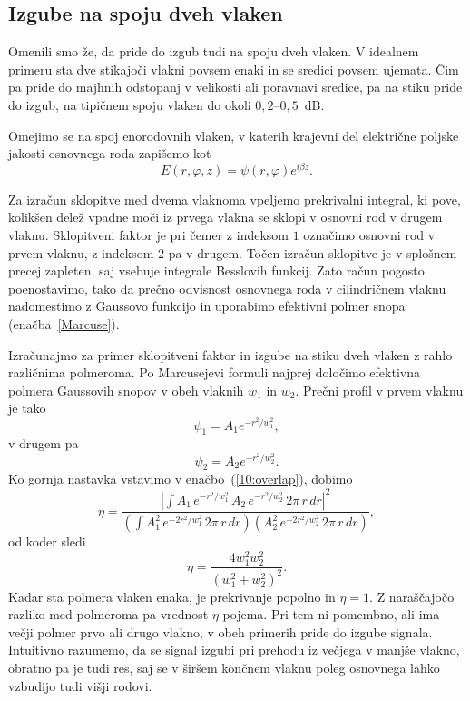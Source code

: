 \subsection*{Izgube na spoju dveh vlaken}
Omenili smo že, da pride do izgub tudi na spoju dveh vlaken. 
V idealnem primeru sta dve stikajoči vlakni povsem enaki in se sredici povsem ujemata. 
Čim pa pride do majhnih odstopanj v velikosti ali poravnavi sredice, pa na stiku pride 
do izgub, na tipičnem spoju vlaken do okoli $0,2$--$0,5$~dB.

Omejimo se na spoj enorodovnih vlaken, v katerih krajevni del 
električne poljske jakosti osnovnega roda zapišemo kot
\begin{equation}
E(r, \varphi, z)=\psi(r, \varphi) e^{i\beta z}.
\end{equation} 

Za izračun sklopitve med dvema vlaknoma vpeljemo prekrivalni integral,
ki pove, kolikšen delež vpadne moči iz prvega vlakna 
se sklopi v osnovni rod v drugem vlaknu. Sklopitveni faktor je
pri čemer z indeksom $1$ označimo osnovni rod v prvem vlaknu, z indeksom $2$ pa 
v drugem. Točen izračun sklopitve je v splošnem precej zapleten, saj vsebuje integrale
Besslovih funkcij. Zato račun pogosto poenostavimo, tako 
da prečno odvisnost osnovnega roda v cilindričnem vlaknu nadomestimo z 
Gaussovo funkcijo in uporabimo efektivni polmer snopa (enačba~\ref{Marcuse}). 

Izračunajmo za primer sklopitveni faktor in izgube na stiku dveh vlaken z rahlo 
različnima polmeroma. Po Marcusejevi formuli najprej določimo efektivna polmera Gaussovih snopov
v obeh vlaknih $w_1$ in $w_2$. Prečni profil v prvem vlaknu je tako
\begin{equation}
\psi_1 = A_1 e^{-r^2/w_1^2},
\end{equation}
v drugem pa 
\begin{equation}
\psi_2 = A_2 e^{-r^2/w_2^2}.
\end{equation}
Ko gornja nastavka vstavimo v enačbo~(\ref{10:overlap}), dobimo
\begin{equation}
\eta = \frac{|\int A_1 \, e^{-r^2/w_1^2}\, A_2\, e^{-r^2/w_2^2}\, 2 \pi\, r\, dr|^2}
{\left(\int A_1^2 \,e^{-2r^2/w_1^2} \, 2 \pi \, r\, dr \right) \left( A_2^2\, 
e^{-2r^2/w_2^2}\, 2 \pi \, r\, dr \right)},
\end{equation}
od koder sledi
\begin{equation}
\eta = \frac{4 w_1^2 w_2^2}{(w_1^2+w_2^2)^2}.
\end{equation}
Kadar sta polmera vlaken enaka, je prekrivanje popolno in $\eta = 1$. Z naraščajočo razliko
med polmeroma pa vrednost $\eta$ pojema. Pri tem
ni pomembno, ali ima večji polmer prvo ali drugo vlakno, v obeh primerih pride do izgube 
signala. Intuitivno razumemo, da se signal izgubi pri prehodu iz večjega v manjše vlakno, 
obratno pa je tudi res, saj se v širšem končnem vlaknu poleg osnovnega lahko vzbudijo
tudi višji rodovi. 

